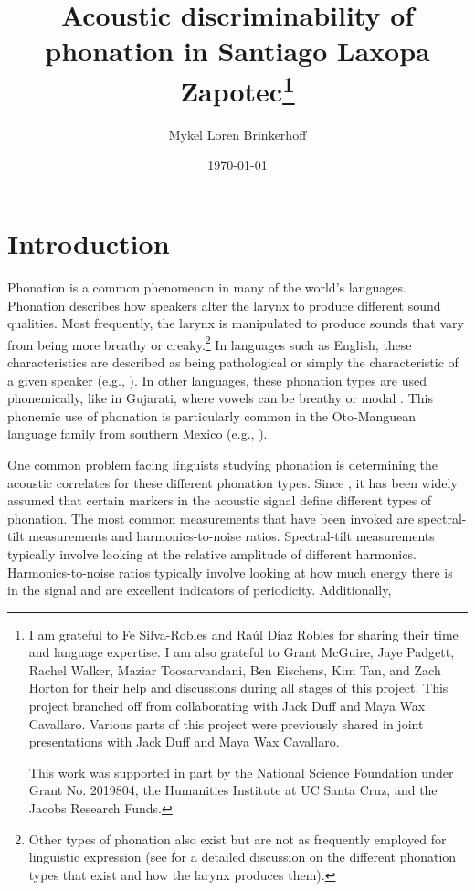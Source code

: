 \documentclass[12pt, letterpaper]{article}
\title{Acoustic discriminability of phonation in Santiago Laxopa Zapotec\thanks{I am grateful to Fe Silva-Robles and  Raúl Díaz Robles for sharing their time and language expertise. I am also grateful to Grant McGuire, Jaye Padgett, Rachel Walker, Maziar Toosarvandani, Ben Eischens, Kim Tan, and Zach Horton for their help and discussions during all stages of this project. This project branched off from collaborating with Jack Duff and Maya Wax Cavallaro. Various parts of this project were previously shared in joint presentations with Jack Duff and Maya Wax Cavallaro.

This work was supported in part by the National Science Foundation under Grant No. 2019804, the Humanities Institute at UC Santa Cruz, and the Jacobs Research Funds.}}
\author{Mykel Loren Brinkerhoff}
\date{\today}
\begin{document}
	

    \onehalfspacing

\maketitle

\tableofcontents

\section{Introduction} \label{sec:Introduction}
Phonation is a common phenomenon in many of the world's languages. Phonation describes how speakers alter the larynx to produce different sound qualities. Most frequently, the larynx is manipulated to produce sounds that vary from being more breathy or creaky.\footnote{Other types of phonation also exist but are not as frequently employed for linguistic expression (see \cite{eslingVoiceQualityLaryngeal2019} for a detailed discussion on the different phonation types that exist and how the larynx produces them).} In languages such as English, these characteristics are described as being pathological or simply the characteristic of a given speaker (e.g., \cite{klattAnalysisSynthesisPerception1990}). In other languages, these phonation types are used phonemically, like in Gujarati, where vowels can be breathy or modal \citep{fischer-jorgensenPhoneticAnalysisBreathy1968}. This phonemic use of phonation is particularly common in the Oto-Manguean language family from southern Mexico (e.g., \cite{suarezMesoamericanIndianLanguages1983,campbellMesoAmericaLinguisticArea1986,silvermanLaryngealComplexityOtomanguean1997,campbellOtomangueanHistoricalLinguistics2017a,campbellOtomangueanHistoricalLinguistics2017}).

One common problem facing linguists studying phonation is determining the acoustic correlates for these different phonation types. Since \citet{fischer-jorgensenPhoneticAnalysisBreathy1968}, it has been widely assumed that certain markers in the acoustic signal define different types of phonation. The most common measurements that have been invoked are spectral-tilt measurements and harmonics-to-noise ratios. Spectral-tilt measurements typically involve looking at the relative amplitude of different harmonics. Harmonics-to-noise ratios typically involve looking at how much energy there is in the signal and are excellent indicators of periodicity. Additionally, 
\end{document}
